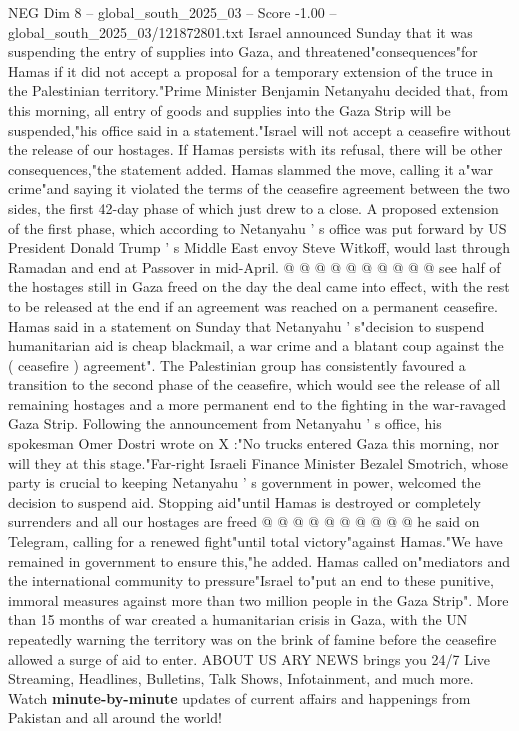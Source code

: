 \begin{textsample}{NEG Dim 8 – global\_south\_2025\_03 – Score -1.00 – global\_south\_2025\_03/121872801.txt}  \label{ex:f8_neg_306}
Israel announced Sunday that it was suspending the entry of supplies into Gaza, and threatened"consequences"for Hamas if it did not accept a proposal for a temporary extension of the truce in the Palestinian territory."Prime Minister Benjamin Netanyahu decided that, from this morning, all entry of goods and supplies into the Gaza Strip will be suspended,"his office said in a statement."Israel will not accept a ceasefire without the release of our hostages.
If Hamas persists with its refusal, there will be other consequences,"the statement added.
Hamas slammed the move, calling it a"war crime"and saying it violated the terms of the ceasefire agreement between the two sides, the first 42-day phase of which just drew to a close.
A proposed extension of the first phase, which according to Netanyahu ' s office was put forward by US President Donald Trump ' s Middle East envoy Steve Witkoff, would last through Ramadan and end at Passover in mid-April. @ @ @ @ @ @ @ @ @ @ see half of the hostages still in Gaza freed on the day the deal came into effect, with the rest to be released at the end if an agreement was reached on a permanent ceasefire.
Hamas said in a statement on Sunday that Netanyahu ' s"decision to suspend humanitarian aid is cheap blackmail, a war crime and a blatant coup against the ( ceasefire ) agreement".
The Palestinian group has consistently favoured a transition to the second phase of the ceasefire, which would see the release of all remaining hostages and a more permanent end to the fighting in the war-ravaged Gaza Strip.
Following the announcement from Netanyahu ' s office, his spokesman Omer Dostri wrote on X :"No trucks entered Gaza this morning, nor will they at this stage."Far-right Israeli Finance Minister Bezalel Smotrich, whose party is crucial to keeping Netanyahu ' s government in power, welcomed the decision to suspend aid.
Stopping aid"until Hamas is destroyed or completely surrenders and all our hostages are freed @ @ @ @ @ @ @ @ @ @ he said on Telegram, calling for a renewed fight"until total victory"against Hamas."We have remained in government to ensure this,"he added.
Hamas called on"mediators and the international community to pressure"Israel to"put an end to these punitive, immoral measures against more than two million people in the Gaza Strip".
More than 15 months of war created a humanitarian crisis in Gaza, with the UN repeatedly warning the territory was on the brink of famine before the ceasefire allowed a surge of aid to enter.
ABOUT US ARY NEWS brings you 24/7 Live Streaming, Headlines, Bulletins, Talk Shows, Infotainment, and much more.
Watch \textbf{minute-by-minute} updates of current affairs and happenings from Pakistan and all around the world!

\end{textsample}

